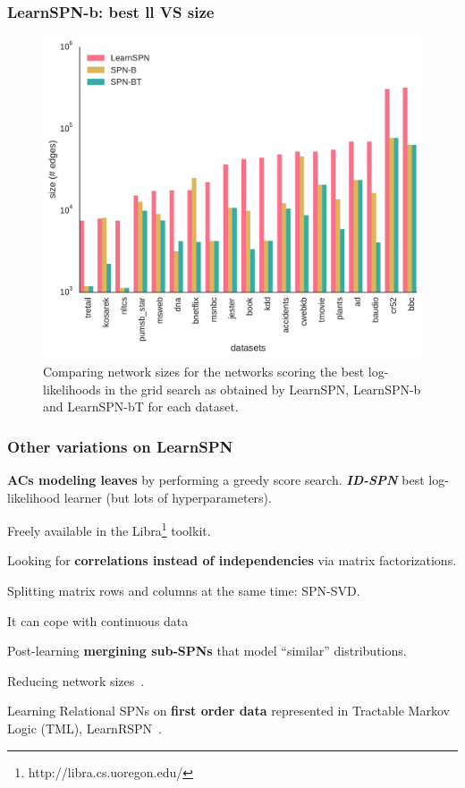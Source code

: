 \documentclass[10pt, t, xcolor={usenames,dvipsnames,svgnames}, compress]{beamer}
\begin{document}
\begin{frame}
  \frametitle{LearnSPN-b: best ll VS size}

  \begin{figure}[htbp]
    \begin{center}
      \includegraphics[width=0.65\linewidth]{figures/edges-comp.pdf}
      \caption{\footnotesize
        Comparing network sizes
        for the networks scoring the best log-likelihoods in the grid
        search as obtained by \textsf{LearnSPN}, \textsf{LearnSPN-b} and
        \textsf{LearnSPN-bT} for each dataset.}
    \end{center}
  \end{figure}
\end{frame}

\begin{frame}
  \frametitle{Other variations on LearnSPN}
  \textbf{ACs modeling leaves} by performing a greedy score
  search.
  \emph{\textbf{ID-SPN}} best log-likelihood learner (but lots of
  hyperparameters).\par
  Freely available in the \textsf{Libra}\footnote{http://libra.cs.uoregon.edu/} toolkit.~\parencite{Rooshenas2014}\par\bigskip
  
  Looking for \textbf{correlations instead of independencies} via matrix
  factorizations.\par
  Splitting matrix rows and columns at the same time: SPN-SVD.\par
  It can cope with continuous data~\parencite{Adel2015}\par\bigskip
  
  Post-learning \textbf{mergining sub-SPNs} that model ``similar'' distributions.\par
  Reducing network sizes~\parencite{Rahman2016}.\par\bigskip

  Learning Relational SPNs on \textbf{first order data}
  represented in Tractable Markov Logic (TML), LearnRSPN~\parencite{Nath2015}.
\end{frame}
\end{document}
